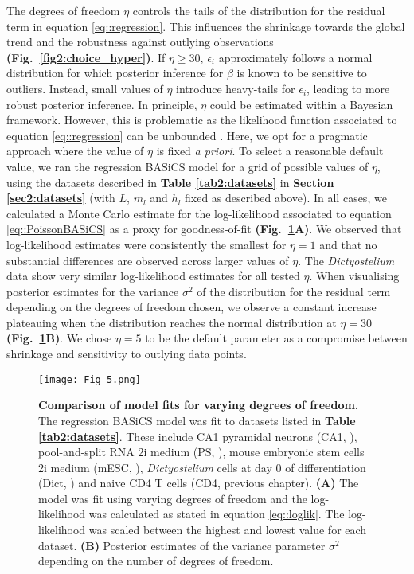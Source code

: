 The degrees of freedom $\eta$ controls the tails of the distribution for the residual term in equation \eqref{eq::regression}. 
This influences the shrinkage towards the global trend and the robustness against outlying observations \textbf{(Fig.~\ref{fig2:choice_hyper})}.  
If $\eta \geq 30$, $\epsilon_i$ approximately follows a normal distribution for which posterior inference for $\beta$ is known to be sensitive to outliers. 
Instead, small values of $\eta$ introduce heavy-tails for $\epsilon_i$, leading to more robust posterior inference. 
In principle, $\eta$ could be estimated within a Bayesian framework. 
However, this is problematic as the likelihood function associated to equation \eqref{eq::regression} can be unbounded \citep{Fernandez1999}. Here, we opt for a pragmatic approach where the value of $\eta$ is fixed \emph{a priori}. 
To select a reasonable default value, we ran the regression BASiCS model for a grid of possible values of $\eta$, using the datasets described in \textbf{Table \ref{tab2:datasets}} in \textbf{Section \ref{sec2:datasets}} (with $L$, $m_l$ and $h_l$ fixed as described above). 
In all cases, we calculated a Monte Carlo estimate for the log-likelihood associated to equation \eqref{eq::PoissonBASiCS} as a proxy for goodness-of-fit \textbf{(Fig.~\ref{fig2:DoF}A)}. 
We observed that log-likelihood estimates were consistently the smallest for $\eta=1$ and that no substantial differences are observed across larger values of $\eta$. 
The \textit{Dictyostelium} data show very similar log-likelihood estimates for all tested $\eta$.  
When visualising posterior estimates for the variance $\sigma^2$ of the distribution for the residual term depending on the degrees of freedom chosen, we observe a constant increase plateauing when the distribution reaches the normal distribution at $\eta=30$ \textbf{(Fig.~\ref{fig2:DoF}B)}. 
We chose $\eta=5$ to be the default parameter as a compromise between shrinkage and sensitivity to outlying data points. 

\begin{figure}[!h]
\centering
\texttt{[image: Fig\_5.png]}
\caption[Comparison of model fits for varying degrees of freedom]{\textbf{Comparison of model fits for varying degrees of freedom.}\\
The regression BASiCS model was fit to datasets listed in \textbf{Table \ref{tab2:datasets}}. 
These include CA1 pyramidal neurons (CA1, \citep{Zeisel2015}), pool-and-split RNA 2i medium (PS, \citep{Grun2014}), mouse embryonic stem cells 2i medium (mESC, \citep{Grun2014}), \textit{Dictyostelium} cells at day 0 of differentiation (Dict, \citep{Antolovic2017}) and naive CD4\plus{} T cells (CD4, previous chapter). 
\textbf{(A)} The model was fit using varying degrees of freedom and the log-likelihood was calculated as stated in equation \eqref{eq::loglik}. The log-likelihood was scaled between the highest and lowest value for each dataset. 
\textbf{(B)} Posterior estimates of the variance parameter $\sigma^2$ depending on the number of degrees of freedom.}
\label{fig2:DoF}
\end{figure}

